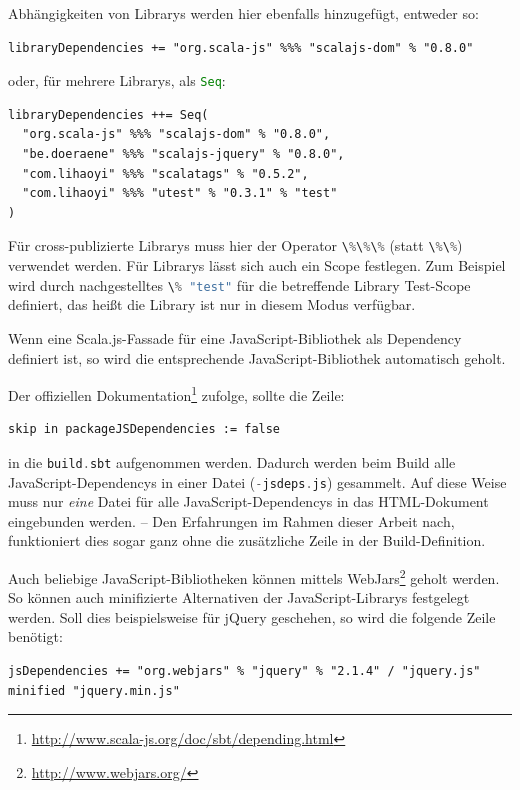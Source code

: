 \documentclass[a4paper, 12pt, hidelinks, listof=totoc, listoftables=totoc, bibliography=totoc]{scrreprt}
\newcommand{\code}[1]{\lstinline[language=Scala, style=inline]|#1|}
\begin{document}
Abhängigkeiten von Librarys werden hier ebenfalls hinzugefügt, entweder so:

\begin{lstlisting}[style=snippet]
libraryDependencies += "org.scala-js" %%% "scalajs-dom" % "0.8.0"
\end{lstlisting}

oder, für mehrere Librarys, als \code{Seq}:

\begin{lstlisting}[style=snippet]
libraryDependencies ++= Seq(
  "org.scala-js" %%% "scalajs-dom" % "0.8.0",
  "be.doeraene" %%% "scalajs-jquery" % "0.8.0",
  "com.lihaoyi" %%% "scalatags" % "0.5.2",
  "com.lihaoyi" %%% "utest" % "0.3.1" % "test"
)
\end{lstlisting}

Für cross-publizierte Librarys muss hier der Operator \code{\%\%\%} (statt \code{\%\%}) verwendet werden. Für Librarys lässt sich auch ein Scope festlegen. Zum Beispiel wird durch nachgestelltes \code{\% "test"} für die betreffende Library Test-Scope definiert, das heißt die Library ist nur in diesem Modus verfügbar.

Wenn eine Scala.js-Fassade für eine JavaScript-Bibliothek als Dependency definiert ist, so wird die entsprechende JavaScript-Bibliothek automatisch geholt.

Der offiziellen Dokumentation\footnote{ \url{http://www.scala-js.org/doc/sbt/depending.html}} zufolge, sollte die Zeile:

\begin{lstlisting}[style=snippet]
skip in packageJSDependencies := false
\end{lstlisting}

in die \code{build.sbt} aufgenommen werden. Dadurch werden beim Build alle JavaScript-Dependencys in einer Datei (\code{-jsdeps.js}) gesammelt. Auf diese Weise muss nur \emph{eine} Datei für alle JavaScript-Dependencys in das \ac{HTML}-Dokument eingebunden werden. -- Den Erfahrungen im Rahmen dieser Arbeit nach, funktioniert dies sogar ganz ohne die zusätzliche Zeile in der Build-Definition.

Auch beliebige JavaScript-Bibliotheken können mittels WebJars\footnote{\url{http://www.webjars.org/}} geholt werden. So können auch minifizierte Alternativen der JavaScript-Librarys festgelegt werden. Soll dies beispielsweise für jQuery geschehen, so wird die folgende Zeile benötigt:

\begin{lstlisting}[style=snippet]
jsDependencies += "org.webjars" % "jquery" % "2.1.4" / "jquery.js" minified "jquery.min.js"
\end{lstlisting}
\end{document}
